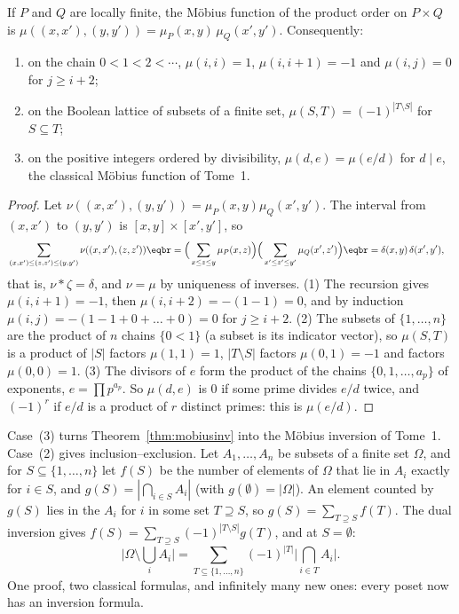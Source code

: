 \begin{proposition}\label{prop:mobiusproduct}
If $P$ and $Q$ are locally finite, the M\"obius function of the product order on $P\times Q$ is
$\mu((x,x'),(y,y'))=\mu_P(x,y)\,\mu_Q(x',y')$. Consequently:
\begin{enumerate}
\item on the chain $0<1<2<\cdots$, $\mu(i,i)=1$, $\mu(i,i+1)=-1$ and $\mu(i,j)=0$ for $j\ge i+2$;
\item on the Boolean lattice of subsets of a finite set, $\mu(S,T)=(-1)^{|T\setminus S|}$ for $S\subseteq T$;
\item on the positive integers ordered by divisibility, $\mu(d,e)=\mu(e/d)$ for $d\mid e$, the classical M\"obius function of Tome~1.
\end{enumerate}
\end{proposition}
\begin{proof}
Let $\nu((x,x'),(y,y'))=\mu_P(x,y)\mu_Q(x',y')$. The interval from $(x,x')$ to $(y,y')$ is $[x,y]\times[x',y']$, so
\[
\begin{aligned}{}&\sum_{(x,x')\le(z,z')\le(y,y')}\nu((x,x'),(z,z'))\eqbr=\Big(\sum_{x\le z\le y}\mu_P(x,z)\Big)\Big(\sum_{x'\le z'\le y'}\mu_Q(x',z')\Big)\eqbr=\delta(x,y)\,\delta(x',y'),\end{aligned}
\]
that is, $\nu*\zeta=\delta$, and $\nu=\mu$ by uniqueness of inverses. (1) The recursion gives $\mu(i,i+1)=-1$, then $\mu(i,i+2)=-(1-1)=0$, and
by induction $\mu(i,j)=-(1-1+0+\dots+0)=0$ for $j\ge i+2$. (2) The subsets of $\{1,\dots,n\}$ are the product of $n$ chains $\{0<1\}$ (a
subset is its indicator vector), so $\mu(S,T)$ is a product of $|S|$ factors $\mu(1,1)=1$, $|T\setminus S|$ factors $\mu(0,1)=-1$ and factors
$\mu(0,0)=1$. (3) The divisors of $e$ form the product of the chains $\{0,1,\dots,a_p\}$ of exponents, $e=\prod p^{a_p}$. So $\mu(d,e)$ is
$0$ if some prime divides $e/d$ twice, and $(-1)^r$ if $e/d$ is a product of $r$ distinct primes: this is $\mu(e/d)$.
\end{proof}

Case~(3) turns Theorem~\ref{thm:mobiusinv} into the M\"obius inversion of Tome~1. Case~(2) gives inclusion--exclusion. Let
$A_1,\dots,A_n$ be subsets of a finite set $\Omega$, and for $S\subseteq\{1,\dots,n\}$ let $f(S)$ be the number of elements of $\Omega$ that lie in $A_i$
exactly for $i\in S$, and $g(S)=|\bigcap_{i\in S}A_i|$ (with $g(\emptyset)=|\Omega|$). An element counted by $g(S)$ lies in the $A_i$ for $i$ in some set
$T\supseteq S$, so $g(S)=\sum_{T\supseteq S}f(T)$. The dual inversion gives $f(S)=\sum_{T\supseteq S}(-1)^{|T\setminus S|}g(T)$, and at $S=\emptyset$:
\[
\Big|\Omega\setminus\bigcup_iA_i\Big|=\sum_{T\subseteq\{1,\dots,n\}}(-1)^{|T|}\Big|\bigcap_{i\in T}A_i\Big| .
\]
One proof, two classical formulas, and infinitely many new ones: every poset now has an inversion formula.

